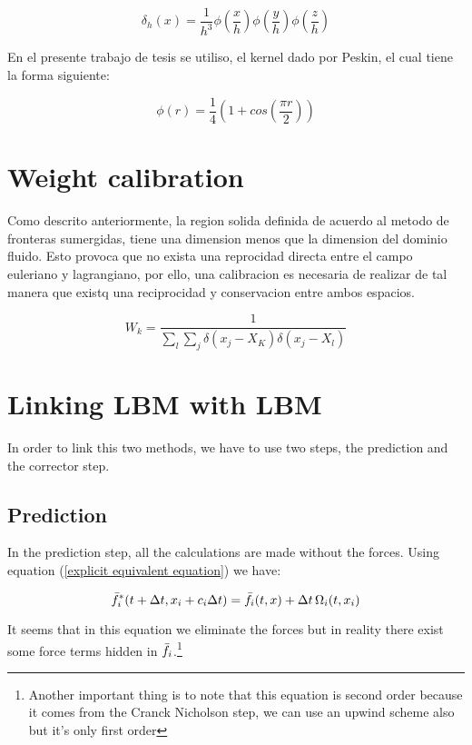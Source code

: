 \begin{equation}
	\delta_h(x) = \frac{1}{h^3}\phi\left(\frac{x}{h}\right)\phi\left(\frac{y}{h}\right)\phi\left(\frac{z}{h}\right)
\end{equation}

En el presente trabajo de tesis se utiliso, el kernel dado por Peskin, el cual
tiene la forma siguiente:

\begin{equation}
	\phi(r) = \frac{1}{4}(1+cos(\frac{\pi r}{2}))
\end{equation}


\section{Weight calibration}
Como descrito anteriormente, la region solida definida de acuerdo al metodo de
fronteras sumergidas, tiene una dimension menos que la dimension del dominio
fluido. Esto provoca que no exista una reprocidad directa entre el campo
euleriano y lagrangiano, por ello, una calibracion es necesaria de realizar de
tal manera que existq una reciprocidad y conservacion entre ambos espacios.

\begin{equation}
	W_k = \frac{1}{\sum_l\sum_j\delta(x_j-X_K)\delta(x_j-X_l)}
\end{equation}

\section{Linking LBM with LBM}
In order to link this two methods, we have to use two steps, the prediction and
the corrector step.

\subsection{Prediction}
In the prediction step, all the calculations are made without the forces. Using
equation (\ref{explicit equivalent equation}) we have:

\begin{equation}
    \Bar{f}_i^* (t+\Delta t, x_i + c_i \Delta t) = \Bar{f}_i (t, x) + \Delta t \, \Omega_i (t, x_i)
\end{equation}

It seems that in this equation we eliminate the forces but in reality there
exist some force terms hidden in $\Bar{f_i}$.\footnote{Another important  thing
is to note that this equation is second order because it comes from the Cranck
Nicholson step, we can use an upwind scheme also but it's only first order} 

